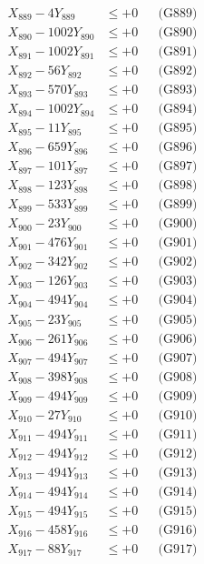 \documentclass[a4paper,10pt]{article}
\begin{document}
{\begin{align}
X_{889} - 4Y_{889} &\leq +0 && \text{(G889)} \\
X_{890} - 1002Y_{890} &\leq +0 && \text{(G890)} \\
\allowbreak
X_{891} - 1002Y_{891} &\leq +0 && \text{(G891)} \\
X_{892} - 56Y_{892} &\leq +0 && \text{(G892)} \\
X_{893} - 570Y_{893} &\leq +0 && \text{(G893)} \\
X_{894} - 1002Y_{894} &\leq +0 && \text{(G894)} \\
X_{895} - 11Y_{895} &\leq +0 && \text{(G895)} \\
X_{896} - 659Y_{896} &\leq +0 && \text{(G896)} \\
X_{897} - 101Y_{897} &\leq +0 && \text{(G897)} \\
X_{898} - 123Y_{898} &\leq +0 && \text{(G898)} \\
X_{899} - 533Y_{899} &\leq +0 && \text{(G899)} \\
X_{900} - 23Y_{900} &\leq +0 && \text{(G900)} \\
\allowbreak
X_{901} - 476Y_{901} &\leq +0 && \text{(G901)} \\
X_{902} - 342Y_{902} &\leq +0 && \text{(G902)} \\
X_{903} - 126Y_{903} &\leq +0 && \text{(G903)} \\
X_{904} - 494Y_{904} &\leq +0 && \text{(G904)} \\
X_{905} - 23Y_{905} &\leq +0 && \text{(G905)} \\
X_{906} - 261Y_{906} &\leq +0 && \text{(G906)} \\
X_{907} - 494Y_{907} &\leq +0 && \text{(G907)} \\
X_{908} - 398Y_{908} &\leq +0 && \text{(G908)} \\
X_{909} - 494Y_{909} &\leq +0 && \text{(G909)} \\
X_{910} - 27Y_{910} &\leq +0 && \text{(G910)} \\
\allowbreak
X_{911} - 494Y_{911} &\leq +0 && \text{(G911)} \\
X_{912} - 494Y_{912} &\leq +0 && \text{(G912)} \\
X_{913} - 494Y_{913} &\leq +0 && \text{(G913)} \\
X_{914} - 494Y_{914} &\leq +0 && \text{(G914)} \\
X_{915} - 494Y_{915} &\leq +0 && \text{(G915)} \\
X_{916} - 458Y_{916} &\leq +0 && \text{(G916)} \\
X_{917} - 88Y_{917} &\leq +0 && \text{(G917)} \\

\end{align}}
\end{document}
